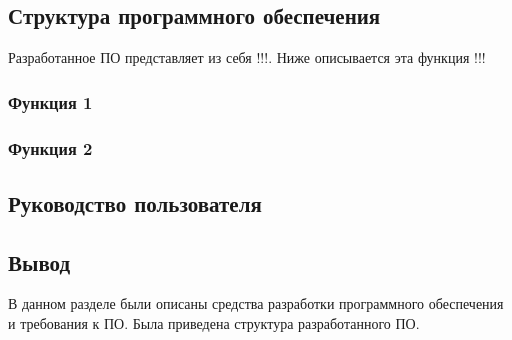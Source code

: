 \subsection{Структура программного обеспечения}

Разработанное ПО представляет из себя !!!. Ниже описывается эта функция  !!!


\subsubsection{Функция 1}


\subsubsection{Функция 2}


\subsection{Руководство пользователя}


\subsection{Вывод}

В данном разделе были описаны средства разработки программного обеспечения и требования к ПО. Была приведена структура разработанного ПО.

\pagebreak

